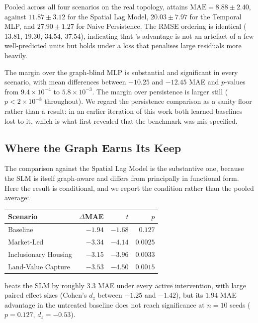 

Pooled across all four scenarios on the real topology, \CGCEN{} attains
$\mathrm{MAE} = 8.88 \pm 2.40$, against $11.87 \pm 3.12$ for the Spatial Lag
Model, $20.03 \pm 7.97$ for the Temporal MLP, and $27.90 \pm 1.27$ for Naive
Persistence. The RMSE ordering is identical ($13.81$, $19.30$, $34.54$,
$37.54$), indicating that \CGCEN{}'s advantage is not an artefact of a few
well-predicted units but holds under a loss that penalises large residuals more
heavily.

The margin over the graph-blind MLP is substantial and significant in every
scenario, with mean differences between $-10.25$ and $-12.45$ MAE and
$p$-values from $9.4 \times 10^{-4}$ to $5.8 \times 10^{-3}$. The margin over
persistence is larger still ($p < 2 \times 10^{-8}$ throughout). We regard the
persistence comparison as a sanity floor rather than a result: in an earlier
iteration of this work both learned baselines lost to it, which is what first
revealed that the benchmark was mis-specified.

\subsection{Where the Graph Earns Its Keep}

The comparison against the Spatial Lag Model is the substantive one, because
the SLM is itself graph-aware and differs from \CGCEN{} principally in
functional form. Here the result is conditional, and we report the condition
rather than the pooled average:

\begin{center}
\begin{tabular}{lrrr}
\toprule
\textbf{Scenario} & $\Delta$\textbf{MAE} & $t$ & $p$ \\
\midrule
Baseline              & $-1.94$ & $-1.68$ & $0.127$ \\
Market-Led            & $-3.34$ & $-4.14$ & $0.0025$ \\
Inclusionary Housing  & $-3.15$ & $-3.96$ & $0.0033$ \\
Land-Value Capture    & $-3.53$ & $-4.50$ & $0.0015$ \\
\bottomrule
\end{tabular}
\end{center}

\CGCEN{} beats the SLM by roughly $3.3$ MAE under every active intervention,
with large paired effect sizes (Cohen's $d_z$ between $-1.25$ and $-1.42$), but
its $1.94$ MAE advantage in the untreated baseline does not reach significance
at $n = 10$ seeds ($p = 0.127$, $d_z = -0.53$).

